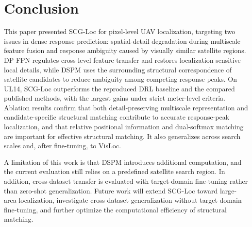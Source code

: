 \documentclass[runningheads]{llncs}
\begin{document}
\section{Conclusion}

This paper presented SCG-Loc for pixel-level UAV localization, targeting two issues in dense response prediction: spatial-detail degradation during multiscale feature fusion and response ambiguity caused by visually similar satellite regions. DP-FPN regulates cross-level feature transfer and restores localization-sensitive local details, while DSPM uses the surrounding structural correspondence of satellite candidates to reduce ambiguity among competing response peaks. On UL14, SCG-Loc outperforms the reproduced DRL baseline and the compared published methods, with the largest gains under strict meter-level criteria. Ablation results confirm that both detail-preserving multiscale representation and candidate-specific structural matching contribute to accurate response-peak localization, and that relative positional information and dual-softmax matching are important for effective structural matching. It also generalizes across search scales and, after fine-tuning, to VisLoc.

A limitation of this work is that DSPM introduces additional computation, and the current evaluation still relies on a predefined satellite search region. In addition, cross-dataset transfer is evaluated with target-domain fine-tuning rather than zero-shot generalization. Future work will extend SCG-Loc toward large-area localization, investigate cross-dataset generalization without target-domain fine-tuning, and further optimize the computational efficiency of structural matching.




\end{document}

